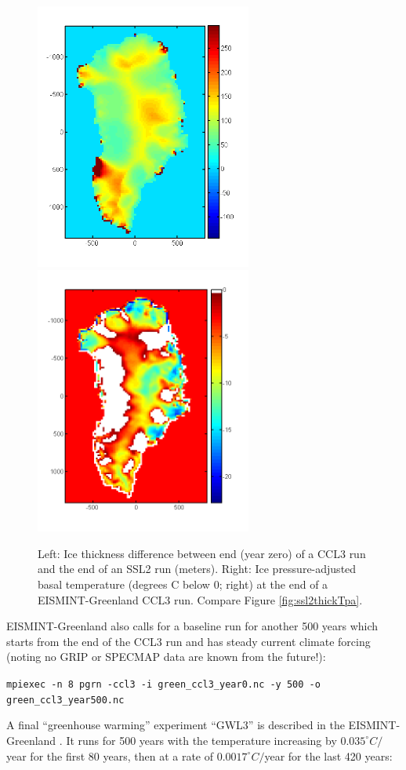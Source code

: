 \documentclass[11pt,final]{amsart}
\begin{document}
\begin{figure}[ht]
\includegraphics[width=2.8in]{Hdiff_CCLSSL}\quad\includegraphics[width=2.8in]{Tpa_CCL}
\caption{Left:  Ice thickness difference between end (year zero) of a CCL3 run and the end of an SSL2 run (meters).  Right:  Ice pressure-adjusted basal temperature (degrees C below 0; right) at the end of a EISMINT-Greenland CCL3 run.  Compare Figure \ref{fig:ssl2thickTpa}.}
\label{fig:cclthickTpa}
\end{figure}

EISMINT-Greenland also calls for a baseline run for another 500 years which starts from the end of the CCL3 run and has steady current climate forcing (noting no GRIP or SPECMAP data are known from the future!):

\verb|mpiexec -n 8 pgrn -ccl3 -i green_ccl3_year0.nc -y 500 -o green_ccl3_year500.nc|

A final ``greenhouse warming'' experiment ``GWL3'' is described in the EISMINT-Greenland \cite{RitzEISMINT}.  It runs for 500 years with the temperature increasing by $0.035^\circ C/$year for the first 80 years, then at a rate of $0.0017^\circ C/$year for the last 420 years:
\end{document}
